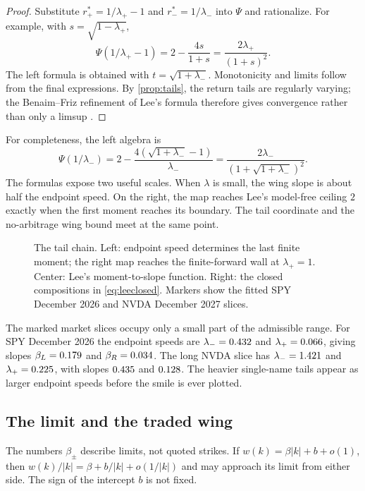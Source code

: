 \begin{proof}
Substitute $r_+^*=1/\lambda_+-1$ and $r_-^*=1/\lambda_-$ into $\Psi$ and
rationalize.  For example, with $s=\sqrt{1-\lambda_+}$,
\[
\Psi(1/\lambda_+-1)=2-\frac{4s}{1+s}
=\frac{2\lambda_+}{(1+s)^2}.
\]
The left formula is obtained with $t=\sqrt{1+\lambda_-}$.  Monotonicity and
limits follow from the final expressions.  By \cref{prop:tails}, the return
tails are regularly varying; the Benaim--Friz refinement of Lee's formula
therefore gives convergence rather than only a limsup
\citep{BenaimFriz2009}.
\end{proof}

For completeness, the left algebra is
\[
\Psi(1/\lambda_-)
=2-\frac{4(\sqrt{1+\lambda_-}-1)}{\lambda_-}
=\frac{2\lambda_-}{(1+\sqrt{1+\lambda_-})^2}.
\]
The formulas expose two useful scales.  When $\lambda$ is small, the wing
slope is about half the endpoint speed.  On the right, the map reaches Lee's
model-free ceiling $2$ exactly when the first moment reaches its boundary.
The tail coordinate and the no-arbitrage wing bound meet at the same point.

\begin{figure}[htbp]
\centering
{}
\caption{The tail chain.  Left: endpoint speed determines the last finite
moment; the right map reaches the finite-forward wall at $\lambda_+=1$.
Center: Lee's moment-to-slope function.  Right: the closed compositions in
\eqref{eq:leeclosed}.  Markers show the fitted SPY December 2026 and NVDA
December 2027 slices.}
\label{fig:tails}
\end{figure}

The marked market slices occupy only a small part of the admissible range.
For SPY December 2026 the endpoint speeds are
$\lambda_-=0.432$ and $\lambda_+=0.066$, giving slopes
$\beta_L=0.179$ and $\beta_R=0.034$.  The long NVDA slice has
$\lambda_-=1.421$ and $\lambda_+=0.225$, with slopes
$0.435$ and $0.128$.  The heavier single-name tails appear
as larger endpoint speeds before the smile is ever plotted.

\subsection{The limit and the traded wing}

The numbers $\beta_\pm$ describe limits, not quoted strikes.  If
$w(k)=\beta|k|+b+o(1)$, then $w(k)/|k|=\beta+b/|k|+o(1/|k|)$ and may approach
its limit from either side.  The sign of the intercept $b$ is not fixed.

